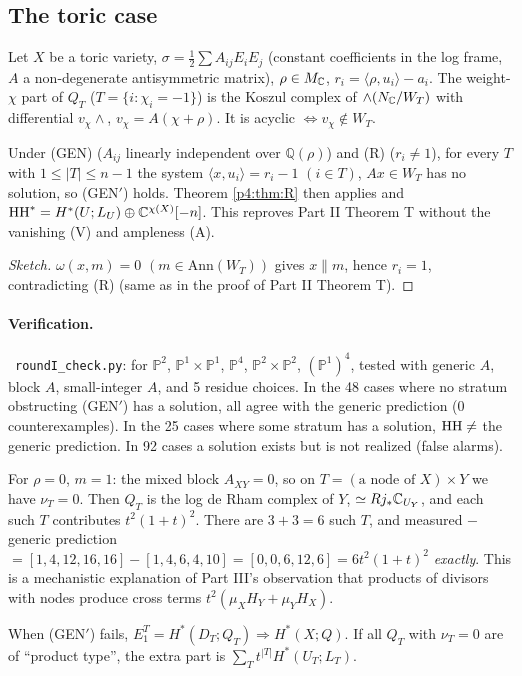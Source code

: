 \subsection{The toric case}\label{p4:sec:toric}
Let $X$ be a toric variety, $\sigma=\tfrac12\sum A_{ij}E_iE_j$ (constant coefficients in the log frame, $A$ a non-degenerate antisymmetric matrix), $\rho\in M_\mathbb C$, $r_i=\langle\rho,u_i\rangle-a_i$. The weight-$\chi$ part of $Q_T$ ($T=\{i:\chi_i=-1\}$) is the Koszul complex of $\wedge(N_\mathbb C/W_T)$ with differential $v_\chi\wedge$, $v_\chi=A(\chi+\rho)$. It is acyclic $\iff v_\chi\notin W_T$. \tP
\begin{prop}\tP\label{p4:prop:toric}
Under (GEN) ($A_{ij}$ linearly independent over $\mathbb Q(\rho)$) and (R) ($r_i\neq1$), for every $T$ with $1\le|T|\le n-1$ the system $\langle x,u_i\rangle=r_i-1$ $(i\in T)$, $Ax\in W_T$ has no solution, so (GEN$'$) holds. Theorem \ref{p4:thm:R} then applies and $\mathrm{HH}^*=H^*(U;L_U)\oplus\mathbb C^{\chi(X)}[-n]$. This reproves Part II Theorem T without the vanishing (V) and ampleness (A).
\end{prop}
\begin{proof}[Sketch]
$\omega(x,m)=0$ $(m\in\mathrm{Ann}(W_T))$ gives $x\parallel m$, hence $r_i=1$, contradicting (R) (same as in the proof of Part II Theorem T).\qedhere
\end{proof}
\paragraph{Verification.}\tV\ \texttt{roundI\_check.py}: for $\mathbb P^2$, $\mathbb P^1\times\mathbb P^1$, $\mathbb P^4$, $\mathbb P^2\times\mathbb P^2$, $(\mathbb P^1)^4$, tested with generic $A$, block $A$, small-integer $A$, and 5 residue choices. In the 48 cases where no stratum obstructing (GEN$'$) has a solution, all agree with the generic prediction (0 counterexamples). In the 25 cases where some stratum has a solution, $\mathrm{HH}\neq$ the generic prediction. In 92 cases a solution exists but is not realized (false alarms).

\begin{ex}[$\mathbb P^2\times\mathbb P^2$, block $A=A_X\oplus A_Y$]\tP\tV
For $\rho=0$, $m=1$: the mixed block $A_{XY}=0$, so on $T=(\text{a node of }X)\times Y$ we have $\nu_T=0$. Then $Q_T$ is the log de Rham complex of $Y$, $\simeq Rj_*\mathbb C_{U_Y}$, and each such $T$ contributes $t^2(1+t)^2$. There are $3+3=6$ such $T$, and measured $-$ generic prediction $=[1,4,12,16,16]-[1,4,6,4,10]=[0,0,6,12,6]=6t^2(1+t)^2$ \emph{exactly}. This is a mechanistic explanation of Part III's observation that products of divisors with nodes produce cross terms $t^2(\mu_XH_Y+\mu_YH_X)$.
\end{ex}
\begin{conj}\label{p4:conj:nonacyc}
When (GEN$'$) fails, $E_1^T=H^*(D_T;Q_T)\Rightarrow H^*(X;Q)$. If all $Q_T$ with $\nu_T=0$ are of ``product type'', the extra part is $\sum_Tt^{|T|}H^*(U_T;L_T)$.
\end{conj}

